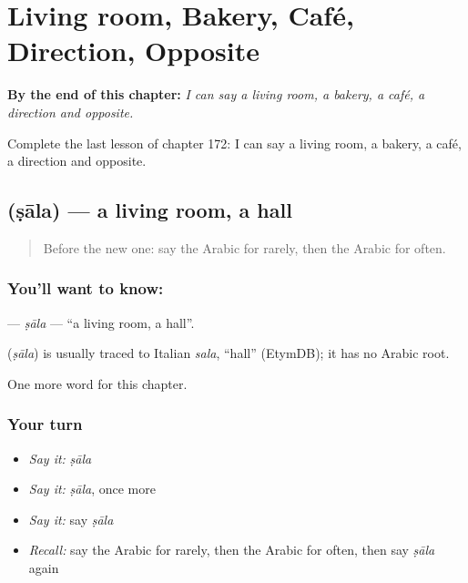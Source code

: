 
\chapter{Living room, Bakery, Café, Direction, Opposite}
\label{ch:ar-living-room-bakery-cafe-direction-opposite}

\begin{chapteropening}
\textbf{By the end of this chapter:} \emph{I can say a living room, a bakery, a café, a direction and opposite.}

Complete the last lesson of chapter 172: I can say a living room, a bakery, a café, a direction and opposite.
\end{chapteropening}

\section[\texorpdfstring{\ar{صالة} (ṣāla)}{صالة (ṣāla)}]{ (ṣāla) — a living room, a hall}

\label{lesson:AR-C172-sala}



\begin{quote}
Before the new one: say the Arabic for rarely, then the Arabic for often.
\end{quote}

\subsection*{You'll want to know: }
\textbf{} — \emph{ṣāla} — \textquotedblleft{}a living room, a hall\textquotedblright{}.

\begin{cousinweb}
\textbf{} (\emph{ṣāla}) is usually traced to Italian \emph{sala}, \textquotedblleft{}hall\textquotedblright{} (EtymDB); it has no Arabic root.
\end{cousinweb}

\begin{grammarlens}[title={What you've built}]
One more word for this chapter.
\end{grammarlens}

\subsection*{Your turn}
\begin{itemize}
\raggedright
  \item \emph{Say it:} \emph{ṣāla}
  \item \emph{Say it:} \emph{ṣāla}, once more
  \item \emph{Say it:} say \emph{ṣāla}
  \item \emph{Recall:} say the Arabic for rarely, then the Arabic for often, then say \emph{ṣāla} again
\end{itemize}

